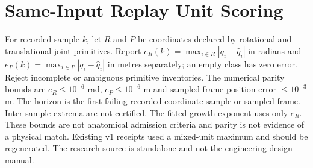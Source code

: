 \documentclass{article}
\begin{document}
\section*{Same-Input Replay Unit Scoring}
For recorded sample $k$, let $R$ and $P$ be coordinates declared by rotational and translational joint primitives. Report $e_R(k)=\max_{i\in R}|q_i-\hat q_i|$ in radians and $e_P(k)=\max_{i\in P}|q_i-\hat q_i|$ in metres separately; an empty class has zero error. Reject incomplete or ambiguous primitive inventories. The numerical parity bounds are $e_R\leq10^{-6}$ rad, $e_P\leq10^{-6}$ m and sampled frame-position error $\leq10^{-3}$ m. The horizon is the first failing recorded coordinate sample or sampled frame. Inter-sample extrema are not certified. The fitted growth exponent uses only $e_R$. These bounds are not anatomical admission criteria and parity is not evidence of a physical match. Existing v1 receipts used a mixed-unit maximum and should be regenerated. The research source is standalone and not the engineering design manual.
\end{document}
